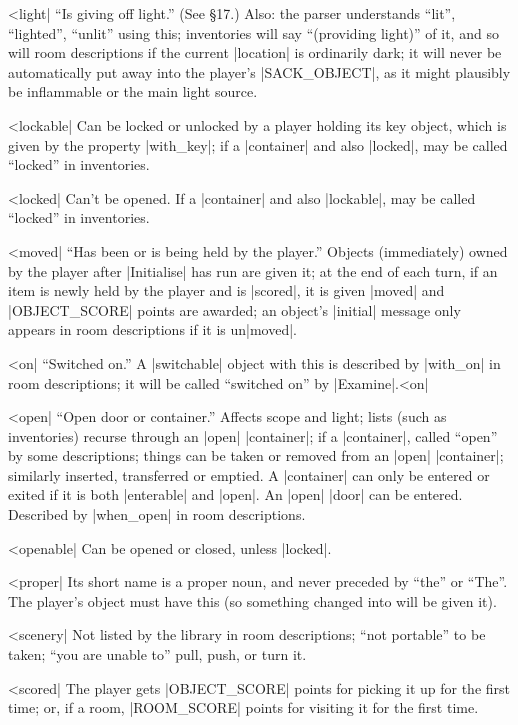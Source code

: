 ^^|light|
``Is giving off light.''  (See \S 17.)  Also: the parser understands
``lit'', ``lighted'', ``unlit'' using this; inventories will
say ``(providing light)'' of it, and so will room descriptions if the
current |location| is ordinarily dark; it will never be automatically
put away into the player's |SACK_OBJECT|, as it might plausibly be
inflammable or the main light source.

^^|lockable|
Can be locked or unlocked by a player
holding its key object, which is given by the property |with_key|;
if a |container| and also |locked|, may be called ``locked'' in
inventories.

^^|locked|
Can't be opened.   If a |container|
and also |lockable|, may be called ``locked'' in inventories.

^^|moved|
``Has been or is being held by the player.''  Objects
(immediately) owned by the player after |Initialise| has run are given
it; at the end of each turn, if an item is newly held by the player
and is |scored|, it is given |moved| and |OBJECT_SCORE| points are
awarded; an object's |initial| message only appears in room
descriptions if it is un|moved|.

^^|on|
``Switched on.''  A |switchable| object with this
is described by |with_on| in room descriptions; it will be called
``switched on'' by |Examine|.^^|on|\

^^|open|
``Open door or container.''  Affects scope and light; lists (such as
inventories) recurse through an |open| |container|; if a |container|, called
``open'' by some descriptions; things can be taken or removed from an |open|
|container|; similarly inserted, transferred or emptied.  A |container| can
only be entered or exited if it is both |enterable| and |open|.  An |open|
|door| can be entered.  Described by |when_open| in room descriptions.

^^|openable|
Can be opened or closed, unless |locked|.

^^|proper|
Its short name is a proper noun, and never preceded
by ``the'' or ``The''.  The player's object must have this (so something
changed into will be given it).

^^|scenery|
Not listed by the library in room descriptions; ``not portable'' to be
taken; ``you are unable to'' pull, push, or turn it.

^^|scored|
The player gets |OBJECT_SCORE| points for picking
it up for the first time; or, if a room, |ROOM_SCORE| points for visiting
it for the first time.

